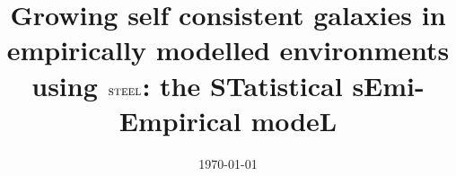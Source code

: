 \documentclass[a4paper, 11pt, twoside]{Thesis} %
\newcommand{\steel}{\textsc{steel} }
\begin{document}
\frontmatter	  %

\title  {Growing self consistent galaxies in empirically modelled environments using $\steel$: the STatistical sEmi-Empirical modeL}
\addresses  {\groupname\\\deptname\\\univname}  %
\date       {\today}
\subject    {}
\keywords   {}

\maketitle


\fancyhead{}  %
\rhead{\thepage}  %
\lhead{}  %

\pagestyle{fancy}  %


\end{document}
